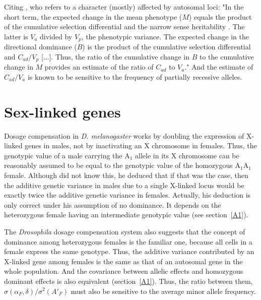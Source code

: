 \documentclass[a4paper,12pt]{article}
\begin{document}
Citing \citet{Kelly1999}, who refers to a character (mostly) affected by autosomal loci: "In the short term, the expected change in the mean phenotype ($M$) equals the product of the cumulative selection differential and the narrow sense heritability \citep{Falconer1989}. The latter is $V_a$ divided by $V_p$, the phenotypic variance. The expected change in the directional dominance ($B$) is the product of the cumulative selection differential and $C_{ad} / V_p$ [...]. Thus, the ratio of the cumulative change in $B$ to the cumulative change in $M$ provides an estimate of the ratio of $C_{ad}$ to $V_a$." And the estimate of $C_{ad}/V_a$ is known to be sensitive to the frequency of partially recessive alleles.

\section{Sex-linked genes}
Dosage compensation in \emph{D. melanogaster} works by doubling the expression of X-linked genes in males, not by inactivating an X chromosome in females. Thus, the genotypic value of a male carrying the A$_1$ allele in its X chromosome can be reasonably assumed to be equal to the genotypic value of the homozygous A$_1$A$_1$ female. Although \citet{James1973} did not know this, he deduced that if that was the case, then the additive genetic variance in males due to a single X-linked locus would be exactly twice the additive genetic variance in females. Actually, his deduction is only correct under his assumption of no dominance. It depends on the heterozygous female having an intermediate genotypic value (see section~\ref{A1}).

The \emph{Drosophila} dosage compensation system also suggests that the concept of dominance among heterozygous females is the familiar one, because all cells in a female express the same genotype. Thus, the additive variance contributed by an X-linked gene among females is the same as that of an autosomal gene in the whole population. And the covariance between allelic effects and homozygous dominant effects is also equivalent (section~\ref{A1}). Thus, the ratio between them, $\sigma(\alpha_F, \delta)/\sigma^2(A'_F)$ must also be sensitive to the average minor allele frequency.
\end{document}
